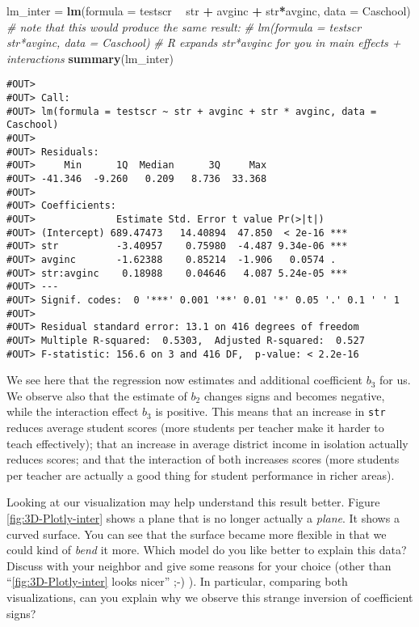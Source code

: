 \documentclass[]{book}
\newenvironment{Shaded}{\begin{snugshade}}{\end{snugshade}}
\newcommand{\KeywordTok}[1]{\textcolor[rgb]{0.13,0.29,0.53}{\textbf{#1}}}
\newcommand{\DataTypeTok}[1]{\textcolor[rgb]{0.13,0.29,0.53}{#1}}
\newcommand{\StringTok}[1]{\textcolor[rgb]{0.31,0.60,0.02}{#1}}
\newcommand{\CommentTok}[1]{\textcolor[rgb]{0.56,0.35,0.01}{\textit{#1}}}
\newcommand{\OperatorTok}[1]{\textcolor[rgb]{0.81,0.36,0.00}{\textbf{#1}}}
\newcommand{\NormalTok}[1]{#1}
\begin{document}
\begin{Shaded}
\begin{Highlighting}[]
\NormalTok{lm_inter =}\StringTok{ }\KeywordTok{lm}\NormalTok{(}\DataTypeTok{formula =}\NormalTok{ testscr }\OperatorTok{~}\StringTok{ }\NormalTok{str }\OperatorTok{+}\StringTok{ }\NormalTok{avginc }\OperatorTok{+}\StringTok{ }\NormalTok{str}\OperatorTok{*}\NormalTok{avginc, }\DataTypeTok{data =}\NormalTok{ Caschool)}
\CommentTok{# note that this would produce the same result:}
\CommentTok{# lm(formula = testscr ~ str*avginc, data = Caschool)}
\CommentTok{# R expands str*avginc for you in main effects + interactions}
\KeywordTok{summary}\NormalTok{(lm_inter)}
\end{Highlighting}
\end{Shaded}

\begin{verbatim}
#OUT> 
#OUT> Call:
#OUT> lm(formula = testscr ~ str + avginc + str * avginc, data = Caschool)
#OUT> 
#OUT> Residuals:
#OUT>     Min      1Q  Median      3Q     Max 
#OUT> -41.346  -9.260   0.209   8.736  33.368 
#OUT> 
#OUT> Coefficients:
#OUT>              Estimate Std. Error t value Pr(>|t|)    
#OUT> (Intercept) 689.47473   14.40894  47.850  < 2e-16 ***
#OUT> str          -3.40957    0.75980  -4.487 9.34e-06 ***
#OUT> avginc       -1.62388    0.85214  -1.906   0.0574 .  
#OUT> str:avginc    0.18988    0.04646   4.087 5.24e-05 ***
#OUT> ---
#OUT> Signif. codes:  0 '***' 0.001 '**' 0.01 '*' 0.05 '.' 0.1 ' ' 1
#OUT> 
#OUT> Residual standard error: 13.1 on 416 degrees of freedom
#OUT> Multiple R-squared:  0.5303,  Adjusted R-squared:  0.527 
#OUT> F-statistic: 156.6 on 3 and 416 DF,  p-value: < 2.2e-16
\end{verbatim}

We see here that the regression now estimates and additional coefficient
\(b_3\) for us. We observe also that the estimate of \(b_2\) changes
signs and becomes negative, while the interaction effect \(b_3\) is
positive. This means that an increase in \texttt{str} reduces average
student scores (more students per teacher make it harder to teach
effectively); that an increase in average district income in isolation
actually reduces scores; and that the interaction of both increases
scores (more students per teacher are actually a good thing for student
performance in richer areas).

Looking at our visualization may help understand this result better.
Figure \ref{fig:3D-Plotly-inter} shows a plane that is no longer
actually a \emph{plane}. It shows a curved surface. You can see that the
surface became more flexible in that we could kind of \emph{bend} it
more. Which model do you like better to explain this data? Discuss with
your neighbor and give some reasons for your choice (other than
``\ref{fig:3D-Plotly-inter} looks nicer'' ;-) ). In particular,
comparing both visualizations, can you explain why we observe this
strange inversion of coefficient signs?
\end{document}
